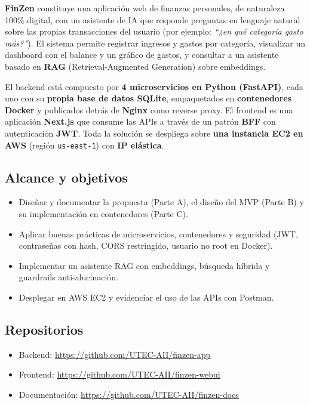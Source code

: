 \documentclass[12pt,letterpaper]{article}
\begin{document}
\textbf{FinZen} constituye una aplicaci\'on web de finanzas personales, de naturaleza 100\% digital, con un
asistente de IA que responde preguntas en lenguaje natural sobre las propias
transacciones del usuario (por ejemplo: \emph{``¿en qu\'e categor\'ia gasto m\'as?''}).
El sistema permite registrar ingresos y gastos por categor\'ia, visualizar un
dashboard con el balance y un gr\'afico de gastos, y consultar a un asistente
basado en \textbf{RAG} (Retrieval-Augmented Generation) sobre embeddings.

El backend est\'a compuesto por \textbf{4 microservicios en Python (FastAPI)},
cada uno con su \textbf{propia base de datos SQLite}, empaquetados en
\textbf{contenedores Docker} y publicados detr\'as de \textbf{Nginx} como reverse
proxy. El frontend es una aplicaci\'on \textbf{Next.js} que consume las APIs a
trav\'es de un patr\'on \textbf{BFF} con autenticaci\'on \textbf{JWT}. Toda la
soluci\'on se despliega sobre \textbf{una instancia EC2 en AWS} (regi\'on
\texttt{us-east-1}) con \textbf{IP el\'astica}.

\subsection*{Alcance y objetivos}
\begin{itemize}[leftmargin=1.2cm]
  \item Dise\~nar y documentar la propuesta (Parte A), el dise\~no del MVP (Parte B)
        y su implementaci\'on en contenedores (Parte C).
  \item Aplicar buenas pr\'acticas de microservicios, contenedores y seguridad
        (JWT, contrase\~nas con hash, CORS restringido, usuario no root en Docker).
  \item Implementar un asistente RAG con embeddings, b\'usqueda h\'ibrida y
        guardrails anti-alucinaci\'on.
  \item Desplegar en AWS EC2 y evidenciar el uso de las APIs con Postman.
\end{itemize}

\subsection*{Repositorios}
\begin{itemize}[leftmargin=1.2cm]
  \item Backend: \url{https://github.com/UTEC-AII/finzen-app}
  \item Frontend: \url{https://github.com/UTEC-AII/finzen-webui}
  \item Documentaci\'on: \url{https://github.com/UTEC-AII/finzen-docs}
\end{itemize}
\end{document}
